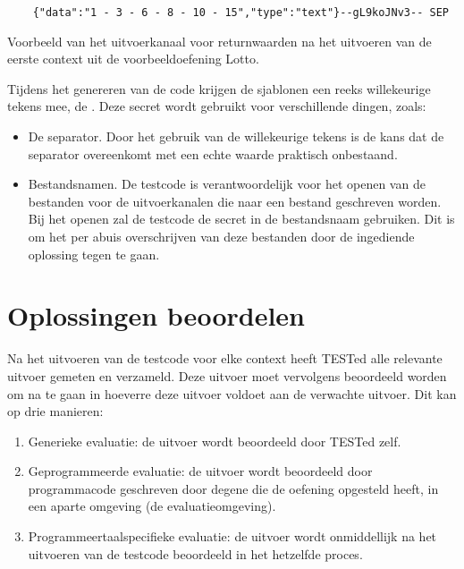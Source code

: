 \begin{listing}
    \begin{verbatim}
    {"data":"1 - 3 - 6 - 8 - 10 - 15","type":"text"}--gL9koJNv3-- SEP
    \end{verbatim}
    \caption{Voorbeeld van het uitvoerkanaal voor returnwaarden na het uitvoeren van de eerste context uit de voorbeeldoefening Lotto.}
    \label{lst:uitvoer}
\end{listing}

Tijdens het genereren van de code krijgen de sjablonen een reeks willekeurige tekens mee, de .
Deze secret wordt gebruikt voor verschillende dingen, zoals:
\begin{itemize}
    \item De separator.
    Door het gebruik van de willekeurige tekens is de kans dat de separator overeenkomt met een echte waarde praktisch onbestaand.
    \item Bestandsnamen.
    De testcode is verantwoordelijk voor het openen van de bestanden voor de uitvoerkanalen die naar een bestand geschreven worden.
    Bij het openen zal de testcode de secret in de bestandsnaam gebruiken.
    Dit is om het per abuis overschrijven van deze bestanden door de ingediende oplossing tegen te gaan.
\end{itemize}

\section{Oplossingen beoordelen}\label{sec:oplossingen-beoordelen}

Na het uitvoeren van de testcode voor elke context heeft TESTed alle relevante uitvoer gemeten en verzameld.
Deze uitvoer moet vervolgens beoordeeld worden om na te gaan in hoeverre deze uitvoer voldoet aan de verwachte uitvoer.
Dit kan op drie manieren:
\begin{enumerate}
    \item Generieke evaluatie: de uitvoer wordt beoordeeld door TESTed zelf.
    \item Geprogrammeerde evaluatie: de uitvoer wordt beoordeeld door programmacode geschreven door degene die de oefening opgesteld heeft, in een aparte omgeving (de evaluatieomgeving).
    \item Programmeertaalspecifieke evaluatie: de uitvoer wordt onmiddellijk na het uitvoeren van de testcode beoordeeld in het hetzelfde proces.
\end{enumerate}


